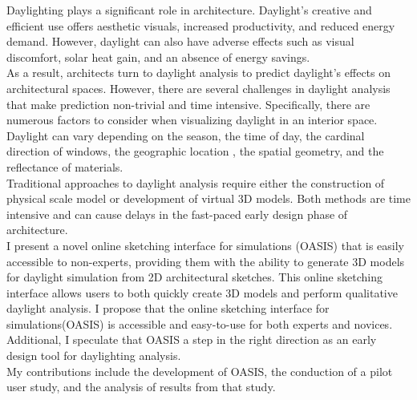 Daylighting plays a significant role in architecture.
Daylight's creative and efficient use offers aesthetic visuals, increased productivity, and reduced energy demand. 
However, daylight can also have adverse effects such as visual discomfort, solar heat gain, and an absence of energy savings. \\
As a result, architects turn to daylight analysis to predict daylight's effects on architectural spaces. However, there are several challenges in daylight analysis that make prediction non-trivial and time intensive. Specifically, there are numerous factors to consider when visualizing daylight in an interior space. Daylight can vary depending on the season, the time of day, the cardinal direction of windows, the geographic location , the spatial geometry, and the reflectance of materials. \\
Traditional approaches to daylight analysis require either the construction of physical scale model or development of virtual 3D models. Both methods are time intensive and can cause delays in the fast-paced early design phase of architecture. \\
I present a novel online sketching interface for simulations (OASIS) that is easily accessible to non-experts, providing them with the ability to generate 3D models for daylight simulation from 2D architectural sketches. 
This online sketching interface allows users to both quickly create 3D models and perform qualitative daylight analysis.
I propose that the online sketching interface for simulations(OASIS) is accessible and easy-to-use for both experts and novices.
Additional, I speculate that OASIS a step in the right direction as an early design tool for daylighting analysis.\\
My contributions include the development of OASIS, the conduction of a pilot user study, and the analysis of results from that study. \\

